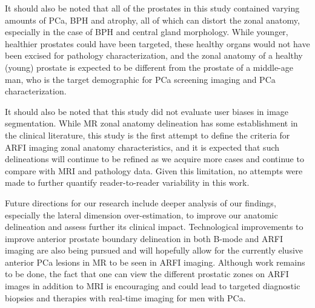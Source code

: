 It should also be noted that all of the prostates in this study contained
varying amounts of PCa, BPH and atrophy, all of which can distort the zonal
anatomy, especially in the case of BPH and central gland morphology.  While
younger, healthier prostates could have been targeted, these healthy organs
would not have been excised for pathology characterization, and the zonal
anatomy of a healthy (young) prostate is expected to be different from the
prostate of a middle-age man, who is the target demographic for PCa screening
imaging and PCa characterization. 

It should also be noted that this study did not evaluate user biases in image
segmentation.  While MR zonal anatomy delineation has some establishment in the
clinical literature, this study is the first attempt to define the criteria for
ARFI imaging zonal anatomy characteristics, and it is expected that such
delineations will continue to be refined as we acquire more cases and continue
to compare with MRI and pathology data.  Given this limitation, no attempts
were made to further quantify reader-to-reader variability in this work.

Future directions for our research include deeper analysis of our findings,
especially the lateral dimension over-estimation, to improve our anatomic
delineation and assess further its clinical impact.  Technological improvements
to improve anterior prostate boundary delineation in both B-mode and ARFI
imaging are also being pursued and will hopefully allow for the currently
elusive anterior PCa lesions in MR to be seen in ARFI imaging.  Although work
remains to be done, the fact that one can view the different prostatic zones on
ARFI images in addition to MRI is encouraging and could lead to targeted
diagnostic biopsies and therapies with real-time imaging for men with PCa. 
